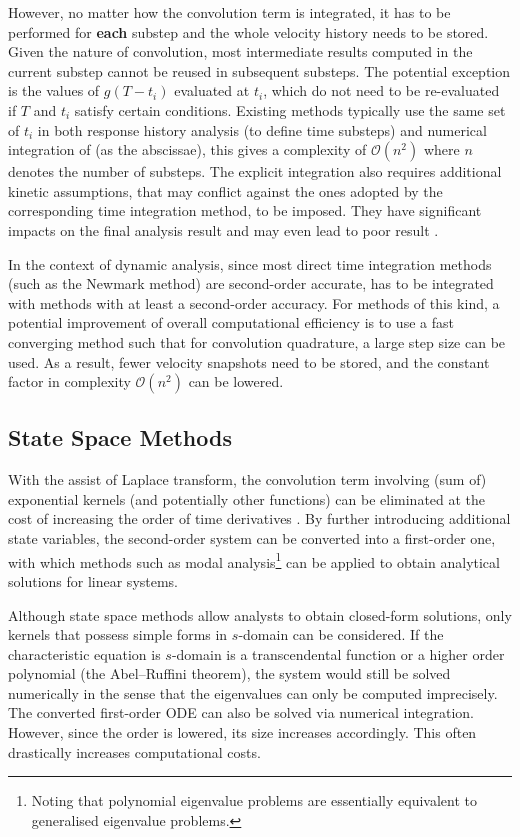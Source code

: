 However, no matter how the convolution term is integrated, it has to be performed for \textbf{each} substep and the whole velocity history needs to be stored. Given the nature of convolution, most intermediate results computed in the current substep cannot be reused in subsequent substeps. The potential exception is the values of $g(T-t_i)$ evaluated at $t_i$, which do not need to be re-evaluated if $T$ and $t_i$ satisfy certain conditions. Existing methods typically use the same set of $t_i$ in both response history analysis (to define time substeps) and numerical integration of  (as the abscissae), this gives a complexity of $\mathcal{O}\left(n^2\right)$ where $n$ denotes the number of substeps. The explicit integration also requires additional kinetic assumptions, that may conflict against the ones adopted by the corresponding time integration method, to be imposed. They have significant impacts on the final analysis result \citep[see][]{Liu2014} and may even lead to poor result \cite[see][Figs. 12, 17, 25, 26]{Liu2023}.

In the context of dynamic analysis, since most direct time integration methods (such as the Newmark method) are second-order accurate,  has to be integrated with methods with at least a second-order accuracy. For methods of this kind, a potential improvement of overall computational efficiency is to use a fast converging method \citep{Schaedle2006} such that for convolution quadrature, a large step size can be used. As a result, fewer velocity snapshots need to be stored, and the constant factor in complexity $\mathcal{O}\left(n^2\right)$ can be lowered.
\subsection{State Space Methods}
With the assist of Laplace transform, the convolution term involving (sum of) exponential kernels (and potentially other functions) can be eliminated at the cost of increasing the order of time derivatives \citep[see, e.g.,][]{Wu2019}. By further introducing additional state variables, the second-order system  can be converted into a first-order one, with which methods such as modal analysis\footnote{Noting that polynomial eigenvalue problems are essentially equivalent to generalised eigenvalue problems.} can be applied to obtain analytical solutions for linear systems.

Although state space methods allow analysts to obtain closed-form solutions, only kernels that possess simple forms in $s$-domain can be considered. If the characteristic equation is $s$-domain is a transcendental function or a higher order polynomial (the Abel--Ruffini theorem), the system would still be solved numerically in the sense that the eigenvalues can only be computed imprecisely. The converted first-order ODE can also be solved via numerical integration. However, since the order is lowered, its size increases accordingly. This often drastically increases computational costs.
